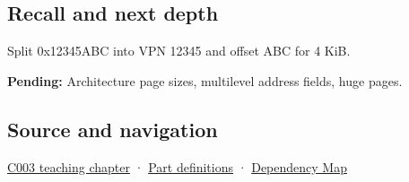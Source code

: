 \subsection{Recall and next depth}\label{appendix-0c67cd5bf30a-recall-and-next-depth}

Split 0x12345ABC into VPN 12345 and offset ABC for 4 KiB.

\textbf{Pending:} Architecture page sizes, multilevel address fields, huge pages.

\subsection{Source and navigation}\label{appendix-0c67cd5bf30a-source-and-navigation}

\hyperref[01-foundations-i-ch002-where-the-bytes-live]{C003 teaching chapter} · \hyperref[appendix-fd090d982a15-m003---parts-41-60]{Part definitions} · \hyperref[appendix-4ad47bdd269a]{Dependency Map}

